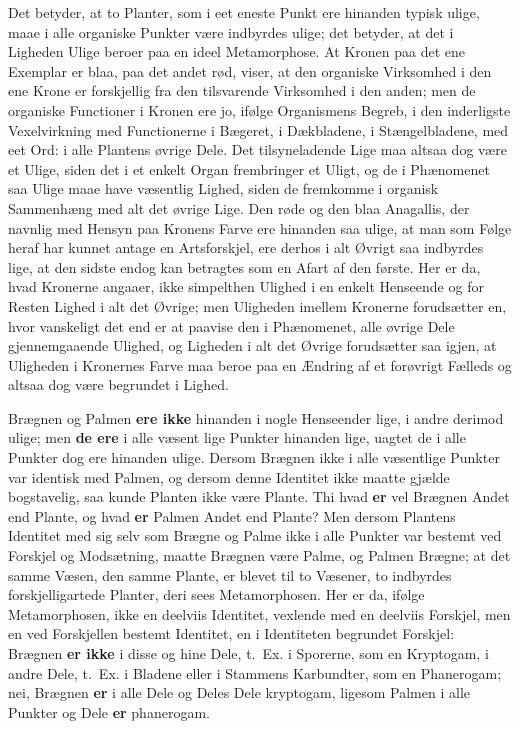 \documentclass[11pt]{book}
\newcommand{\opage}[1]{\marginnote{\footnotesize\textit{[#1]}}}
\begin{document}
Det betyder, at to Planter, som i eet eneste Punkt ere hinanden typisk
ulige, maae i alle organiske Punkter være indbyrdes ulige; det betyder, at
det i Ligheden Ulige beroer paa en ideel Metamorphose. At Kronen paa det ene
Exemplar er blaa, paa det andet rød, viser, at den organiske Virksomhed i
den ene Krone er forskjellig fra den tilsvarende Virksomhed i den anden; men
de organiske Functioner i Kronen ere jo, ifølge Organismens Begreb, i den
inderligste Vexelvirkning med Functionerne i Bægeret, i Dækbladene, i
Stængelbladene, med eet Ord: i alle Plantens øvrige Dele. Det tilsyneladende
Lige maa altsaa dog være et Ulige, siden det i et enkelt Organ frembringer
et Uligt, og de i Phænomenet saa Ulige maae have væsentlig Lighed, siden de
fremkomme i organisk Sammenhæng med alt det øvrige Lige. Den røde og den
blaa Anagallis, der navnlig med Hensyn paa Kronens Farve ere hinanden saa
ulige, at man som Følge heraf har kunnet antage en Artsforskjel, ere derhos
i alt Øvrigt saa indbyrdes lige, at den sidste endog kan betragtes som en
Afart af den første. Her er da, hvad Kronerne angaaer, ikke simpelthen
Ulighed i en enkelt Henseende og for Resten Lighed i alt det Øvrige; men
Uligheden imellem Kronerne forudsætter en, hvor vanskeligt det end er at
paavise den i Phænomenet, alle øvrige Dele gjennemgaaende Ulighed, og
Ligheden i alt det Øvrige forudsætter saa igjen, at Uligheden i Kronernes
Farve maa beroe paa en Ændring af et forøvrigt Fælleds og altsaa dog være
begrundet i Lighed.

Brægnen og Palmen \textbf{ere ikke} hinanden i nogle Henseender lige, i
andre derimod ulige; men \textbf{de ere} i alle væsent\-%
\opage{311} \setcounter{footnote}{0}%
lige Punkter hinanden lige, uagtet de i alle Punkter dog ere hinanden ulige.
Dersom Brægnen ikke i alle væsentlige Punkter var identisk med Palmen, og
dersom denne Identitet ikke maatte gjælde bogstavelig, saa kunde Planten
ikke være Plante. Thi hvad \textbf{er} vel Brægnen Andet end Plante, og hvad
\textbf{er} Palmen Andet end Plante? Men dersom Plantens Identitet med sig
selv som Brægne og Palme ikke i alle Punkter var bestemt ved Forskjel og
Modsætning,
maatte Brægnen være Palme, og Palmen Brægne; at det samme Væsen, den samme
Plante, er blevet til to Væsener, to indbyrdes forskjelligartede Planter,
deri sees Metamorphosen. Her er da, ifølge Metamorphosen, ikke en deelviis
Identitet, vexlende med en deelviis Forskjel, men en ved Forskjellen bestemt
Identitet, en i Identiteten begrundet Forskjel: Brægnen \textbf{er ikke} i
disse og hine Dele, t.~Ex. i Sporerne, som en Kryptogam, i andre Dele,
t.~Ex. i Bladene eller i Stammens Karbundter, som en Phanerogam; nei,
Brægnen \textbf{er} i alle Dele og Deles Dele kryptogam, ligesom Palmen i
alle Punkter og Dele \textbf{er} phanerogam.
\end{document}
